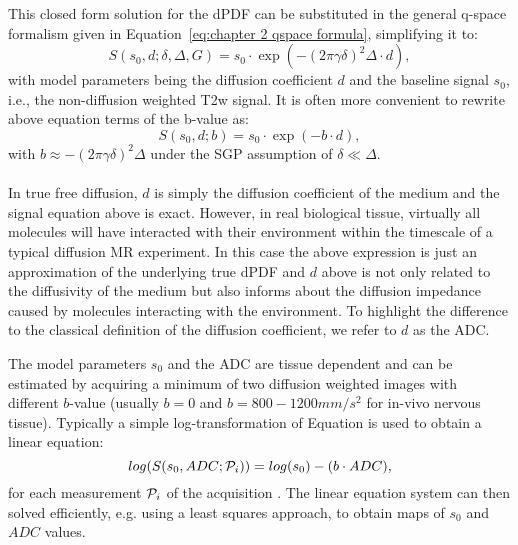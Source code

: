 This closed form solution for the dPDF can be substituted in the general q-space formalism given in Equation~\ref{eq:chapter 2 qspace formula}, simplifying it to:
\begin{equation}
	S(s_0,d;\delta,\Delta,G) = s_0 \cdot \exp(-(2\pi\gamma\delta)^2\Delta \cdot d),
\end{equation}
with model parameters being the diffusion coefficient $d$ and the baseline signal $s_0$, i.e., the non-diffusion weighted T2w signal. It is often more convenient to rewrite above equation terms of the b-value as: 
\begin{equation}
	S(s_0,d;b) = s_0 \cdot \exp(-b \cdot d),
\end{equation}
with $b  \approx -(2\pi\gamma\delta)^2\Delta$ under the \gls{SGP} assumption of $\delta \ll \Delta$.
\paragraph{}
In true free diffusion, $d$ is simply the diffusion coefficient of the medium and the signal equation above is exact. However, in real biological tissue, virtually all molecules will have interacted with their environment within the timescale of a typical diffusion MR experiment. In this case the above expression is just an approximation of the underlying true dPDF and $d$ above is not only related to the diffusivity of the medium but also informs about the diffusion impedance caused by molecules interacting with the environment. To highlight the difference to the classical definition of the diffusion coefficient, we refer to $d$ as the \gls{ADC}.

The model parameters $s_0$ and the \gls{ADC} are tissue dependent and can be estimated by acquiring a minimum of two diffusion weighted images with different $b$-value (usually $b=0$ and $b=800-1200mm/s^2$ for in-vivo nervous tissue). Typically a simple log-transformation of Equation \label{eq:chapter 2 adc} is used to obtain a linear equation:
\begin{equation}
	log(S(s_0,ADC;\mathcal{P}_i)) = log(s_{0}) - (b\cdot ADC),
    \label{eq:chapter 2 adc}
\end{equation}
for each measurement $\mathcal{P}_i$ of the acquisition \prot{}. The linear equation system can then solved efficiently, e.g. using a least squares approach, to obtain maps of $s_0$ and $ADC$ values.

